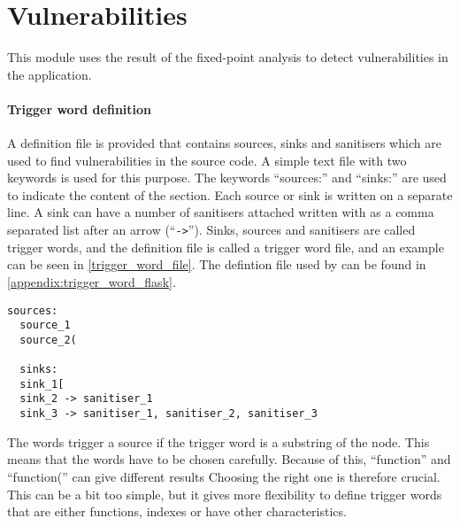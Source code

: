 \section{Vulnerabilities}\label{impl:vulnerabilities}
This module uses the result of the fixed-point analysis to detect vulnerabilities in the application.

\paragraph{Trigger word definition}
A definition file is provided that contains sources, sinks and sanitisers which are used to find vulnerabilities in the source code.
A simple text file with two keywords  is used for this purpose.
The keywords ``sources:'' and ``sinks:'' are used to indicate the content of the section.
Each source or sink is written on a separate line.
A sink can have a number of sanitisers attached written with as a comma separated list after an arrow (``\texttt{->}'').
Sinks, sources and sanitisers are called trigger words, and the definition file is called a trigger word file, and an example can be seen in \cref{trigger_word_file}.
The defintion file used by \pyt{} can be found in \cref{appendix:trigger_word_flask}.
\begin{lstlisting}[style=default, caption={How the trigger word file should be defined.}, label={trigger_word_file}]
  sources:
  source_1
  source_2(

  sinks:
  sink_1[
  sink_2 -> sanitiser_1
  sink_3 -> sanitiser_1, sanitiser_2, sanitiser_3
\end{lstlisting}

The words trigger a source if the trigger word is a substring of the node.
This means that the words have to be chosen carefully.
Because of this, ``function'' and ``function('' can give different results
Choosing the right one is therefore crucial.
This can be a bit too simple, but it gives more flexibility to define trigger words that are either functions, indexes or have other characteristics.

